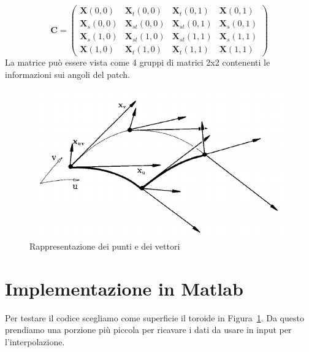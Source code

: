 \documentclass[12pt]{article}
\begin{document}
$$\mathbf{C} = 
\begin{pmatrix}
    \mathbf{X}(0,0)     & \mathbf{X}_t(0,0)     & \mathbf{X}_t(0,1)     & \mathbf{X}(0,1) \\
    \mathbf{X}_s(0,0)   & \mathbf{X}_{st}(0,0)  & \mathbf{X}_{st}(0,1)  & \mathbf{X}_s(0,1) \\
    \mathbf{X}_s(1,0)   & \mathbf{X}_{st}(1,0)  & \mathbf{X}_{st}(1,1)  & \mathbf{X}_s(1,1) \\
    \mathbf{X}(1,0)     & \mathbf{X}_t(1,0)     & \mathbf{X}_t(1,1)     & \mathbf{X}(1,1) 
\end{pmatrix}  $$
La matrice può essere vista come 4 gruppi di matrici 2x2 contenenti le informazioni
sui angoli del patch.

\begin{figure}[H]
    \centering

    \includegraphics[scale=0.7]{img/der.png}

    \caption{Rappresentazione dei punti e dei vettori}\label{fig:1}
\end{figure}

\section{Implementazione in Matlab}
Per testare il codice scegliamo come superficie il toroide in Figura~\ref{fig:1}.
Da questo prendiamo una porzione più piccola per ricavare i dati da usare in input
per l'interpolazione.
\end{document}
